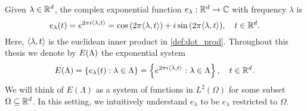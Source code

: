 \documentclass[../thesis.tex]{subfiles}
\begin{document}
Given $\lambda \in \mathbb{R}^d$, the complex exponential function $e_{\lambda}: \mathbb{R}^d \rightarrow \mathbb{C}$ with frequency $\lambda$ is 
\begin{equation*}
    e_{\lambda}(t) = e^{2 \pi i \langle \lambda, t \rangle} = \cos{(2 \pi \langle \lambda, t \rangle)} + i \sin{(2 \pi \langle \lambda, t \rangle)}, \quad t\in \mathbb{R}^d.
\end{equation*}
Here, $\langle \lambda, t \rangle$ is the euclidean inner product in \cref{def:dot_prod}. Throughout this thesis we denote by $E(\Lambda)$ the exponential system
\begin{align*}
    E(\Lambda) = \left\{e_\lambda(t) : \lambda \in \Lambda\right\} = \left\{e^{2\pi i \langle \lambda, t \rangle} : \lambda \in \Lambda\right\}, \quad t\in \mathbb{R}^d.
\end{align*}
We will think of $E(\Lambda)$ as a system of functions in $L^2(\Omega)$ for some subset $\Omega \subseteq \mathbb{R}^d$. In this setting, we intuitively understand $e_\lambda$ to be $e_\lambda$ restricted to $\Omega$. %
\end{document}
